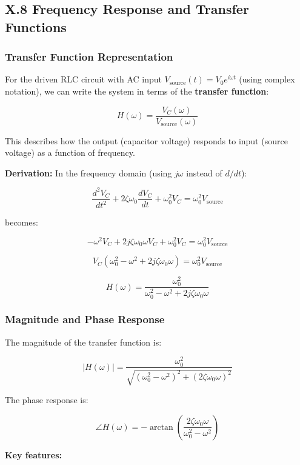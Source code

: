 \documentclass[
]{article}
\begin{document}
\subsection{X.8 Frequency Response and Transfer
Functions}\label{x.8-frequency-response-and-transfer-functions}

\subsubsection{Transfer Function
Representation}\label{transfer-function-representation}

For the driven RLC circuit with AC input
\(V_{\text{source}}(t) = V_0 e^{i\omega t}\) (using complex notation),
we can write the system in terms of the \textbf{transfer function}:

\[H(\omega) = \frac{V_C(\omega)}{V_{\text{source}}(\omega)}\]

This describes how the output (capacitor voltage) responds to input
(source voltage) as a function of frequency.

\textbf{Derivation:} In the frequency domain (using \(j\omega\) instead
of \(d/dt\)):

\[\frac{d^2V_C}{dt^2} + 2\zeta\omega_0\frac{dV_C}{dt} + \omega_0^2 V_C = \omega_0^2 V_{\text{source}}\]

becomes:

\[-\omega^2 V_C + 2j\zeta\omega_0\omega V_C + \omega_0^2 V_C = \omega_0^2 V_{\text{source}}\]

\[V_C(\omega_0^2 - \omega^2 + 2j\zeta\omega_0\omega) = \omega_0^2 V_{\text{source}}\]

\[\boxed{H(\omega) = \frac{\omega_0^2}{\omega_0^2 - \omega^2 + 2j\zeta\omega_0\omega}}\]

\subsubsection{Magnitude and Phase
Response}\label{magnitude-and-phase-response}

The magnitude of the transfer function is:

\[|H(\omega)| = \frac{\omega_0^2}{\sqrt{(\omega_0^2 - \omega^2)^2 + (2\zeta\omega_0\omega)^2}}\]

The phase response is:

\[\angle H(\omega) = -\arctan\left(\frac{2\zeta\omega_0\omega}{\omega_0^2 - \omega^2}\right)\]

\textbf{Key features:}
\end{document}
